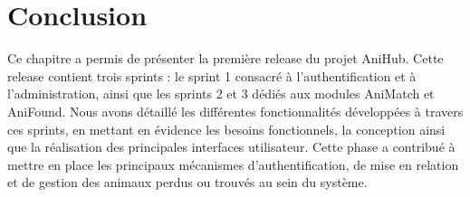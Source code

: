 \newpage
\section{Conclusion}

Ce chapitre a permis de présenter la première release du projet AniHub. Cette release contient trois sprints : le sprint 1 consacré à l’authentification et à l’administration, ainsi que les sprints 2 et 3 dédiés aux modules AniMatch et AniFound. Nous avons détaillé les différentes fonctionnalités développées à travers ces sprints, en mettant en évidence les besoins fonctionnels, la conception ainsi que la réalisation des principales interfaces utilisateur. Cette phase a contribué à mettre en place les principaux mécanismes d’authentification, de mise en relation et de gestion des animaux perdus ou trouvés au sein du système.